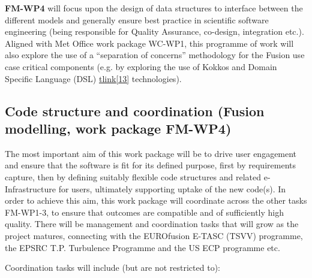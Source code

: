 \textbf{FM-WP4} will focus upon the design of data structures to interface 
between the different models and generally
ensure best practice in scientific software engineering (being responsible for 
Quality Assurance, co-design,
integration etc.). Aligned with Met Office work {package WC-WP1, this programme 
of work will also
explore the use of a ``separation of concerns'' methodology for the Fusion use 
case critical components (e.g. by
exploring the use of Kokkos
}\href{https://cfwebprod.sandia.gov/cfdocs/CompResearch/docs/Kokkos-Multi-CoE.pd
f}{\textstyleInternetlink{{[12]}}}{
and Domain Specific Language (DSL)
}\href{https://en.wikipedia.org/wiki/Domain-specific_language}{\textstyleInterne
tlink{{[13]}}}{ technologies}).

\subsection[Code structure and coordination (Fusion modelling, work package
FM{}-WP4)]{\textbf{\textcolor[rgb]{0.12156863,0.28627452,0.49019608}{Code 
structure and coordination
}}\textcolor[rgb]{0.12156863,0.28627452,0.49019608}{(Fusion modelling, work 
package
}\textbf{\textcolor[rgb]{0.12156863,0.28627452,0.49019608}{FM-WP4}}\textcolor[rg
b]{0.12156863,0.28627452,0.49019608}{)}}

\bigskip

The most important aim of this work package will be to drive user engagement 
and ensure that the software is fit for its
defined purpose, first by requirements capture, then by defining suitably 
flexible code structures and related
e-Infrastructure for users, ultimately supporting uptake of the new code(s). In 
order to achieve this aim, this work
package will coordinate across the other tasks FM-WP1-3, to ensure that 
outcomes are compatible and of sufficiently
high quality. There will be management and coordination tasks that will grow as 
the project matures,
{connecting with the EUROfusion E-TASC (TSVV) programme, the EPSRC T.P. 
Turbulence Programme
}\href{https://www.york.ac.uk/physics/news/departmentalnews/plasma-fusion/major-
grant-award-supports-fusion-energy-research/}{\textstyleInternetlink{{[20]}}}{
and the }US ECP programme etc.


\bigskip

Coordination tasks will include (but are not restricted to):


\bigskip

